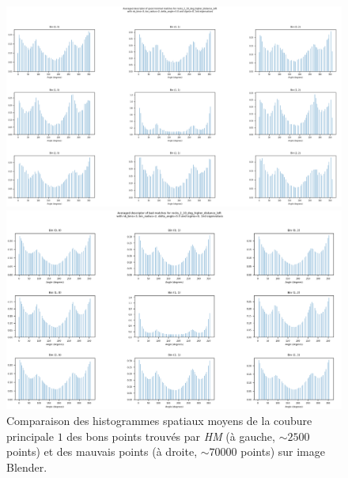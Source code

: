 \documentclass[
	a4paper, %
	10pt, %
	unnumberedsections, %
	twoside, %
]{LTJournalArticle}
\begin{document}
\begin{figure}
	\centering
	\begin{minipage}{\textwidth}
		\centering
		\includegraphics[width=\textwidth]{images/avg_gd_min_desc_10_left_1eig}
	\end{minipage}
	\begin{minipage}{\textwidth}
		\centering
		\includegraphics[width=\textwidth]{images/avg_bad_desc_10_left_1eig.png}
	\end{minipage}
	\caption{Comparaison des histogrammes spatiaux moyens de la coubure principale $1$ des bons points trouvés par \textit{HM} (à gauche, $\sim 2500$ points) et
		des mauvais points (à droite, $\sim 70000$ points) sur image Blender.}
	\label{figure:desc_comp}
\end{figure}

\clearpage
\end{document}
